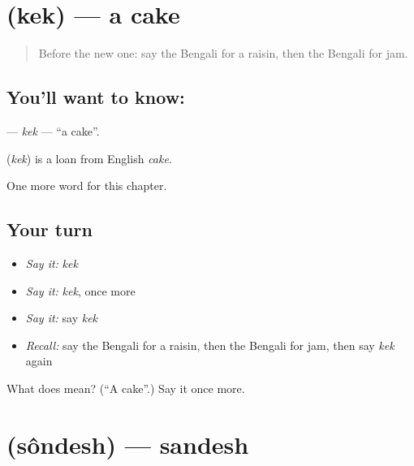 \section[\texorpdfstring{\bn{কেক} (kek)}{কেক (kek)}]{ (kek) — a cake}

\label{lesson:BN-C165-kek}



\begin{quote}
Before the new one: say the Bengali for a raisin, then the Bengali for jam.
\end{quote}

\subsection*{You'll want to know: }
\textbf{} — \emph{kek} — \textquotedblleft{}a cake\textquotedblright{}.

\begin{cousinweb}
\textbf{} (\emph{kek}) is a loan from English \emph{cake}.
\end{cousinweb}

\begin{grammarlens}[title={What you've built}]
One more word for this chapter.
\end{grammarlens}

\subsection*{Your turn}
\begin{itemize}
\raggedright
  \item \emph{Say it:} \emph{kek}
  \item \emph{Say it:} \emph{kek}, once more
  \item \emph{Say it:} say \emph{kek}
  \item \emph{Recall:} say the Bengali for a raisin, then the Bengali for jam, then say \emph{kek} again
\end{itemize}

\begin{tcolorbox}[breakable,colback=teal!4,colframe=teal!35!black,title={Before you move on}]
What does  mean? (\textquotedblleft{}A cake\textquotedblright{}.) Say it once more.
\end{tcolorbox}
\section[\texorpdfstring{\bn{সন্দেশ} (sôndesh)}{সন্দেশ (sôndesh)}]{ (sôndesh) — sandesh}

